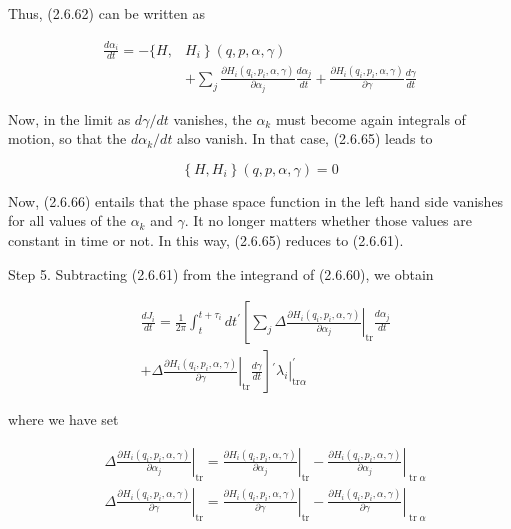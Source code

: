 \documentclass{article}
\begin{document}
Thus, (2.6.62) can be written as
 
\begin{align*}
\frac{d \alpha_{i}}{d t}=-\{H, & \left.H_{i}\right\}(q, p, \alpha, \gamma)  \tag{2.6.65}\\
& +\sum_{j} \frac{\partial H_{i}\left(q_{i}, p_{i}, \alpha, \gamma\right)}{\partial \alpha_{j}} \frac{d \alpha_{j}}{d t}+\frac{\partial H_{i}\left(q_{i}, p_{i}, \alpha, \gamma\right)}{\partial \gamma} \frac{d \gamma}{d t}
\end{align*}
 

Now, in the limit as $d \gamma / d t$ vanishes, the $\alpha_{k}$ must become again integrals of motion, so that the $d \alpha_{k} / d t$ also vanish. In that case, (2.6.65) leads to
 
\begin{equation*}
\left\{H, H_{i}\right\}(q, p, \alpha, \gamma)=0 \tag{2.6.66}
\end{equation*}
 

Now, (2.6.66) entails that the phase space function in the left hand side vanishes for all values of the $\alpha_{k}$ and $\gamma$. It no longer matters whether those values are constant in time or not. In this way, (2.6.65) reduces to (2.6.61).

Step 5. Subtracting (2.6.61) from the integrand of (2.6.60), we obtain
 
\begin{align*}
& \frac{d J_{i}}{d t}=\frac{1}{2 \pi} \int_{t}^{t+\tau_{i}} d t^{\prime}\left[\left.\sum_{j} \Delta \frac{\partial H_{i}\left(q_{i}, p_{i}, \alpha, \gamma\right)}{\partial \alpha_{j}}\right|_{\operatorname{tr}} \frac{d \alpha_{j}}{d t}\right.  \tag{2.6.67}\\
&\left.+\left.\Delta \frac{\partial H_{i}\left(q_{i}, p_{i}, \alpha, \gamma\right)}{\partial \gamma}\right|_{\operatorname{tr}} \frac{d \gamma}{d t}\right]\left.^{\prime} \lambda_{i}\right|_{\mathrm{tr} \alpha} ^{\prime}
\end{align*}
 
where we have set
 
\begin{align*}
& \left.\Delta \frac{\partial H_{i}\left(q_{i}, p_{i}, \alpha, \gamma\right)}{\partial \alpha_{j}}\right|_{\operatorname{tr}}=\left.\frac{\partial H_{i}\left(q_{i}, p_{i}, \alpha, \gamma\right)}{\partial \alpha_{j}}\right|_{\operatorname{tr}}-\left.\frac{\partial H_{i}\left(q_{i}, p_{i}, \alpha, \gamma\right)}{\partial \alpha_{j}}\right|_{\operatorname{tr} \alpha}  \tag{2.6.68a}\\
& \left.\Delta \frac{\partial H_{i}\left(q_{i}, p_{i}, \alpha, \gamma\right)}{\partial \gamma}\right|_{\operatorname{tr}}=\left.\frac{\partial H_{i}\left(q_{i}, p_{i}, \alpha, \gamma\right)}{\partial \gamma}\right|_{\operatorname{tr}}-\left.\frac{\partial H_{i}\left(q_{i}, p_{i}, \alpha, \gamma\right)}{\partial \gamma}\right|_{\operatorname{tr} \alpha} \tag{2.6.68b}
\end{align*}
 
\end{document}

